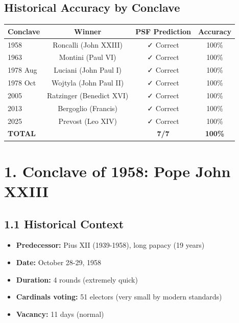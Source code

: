 \documentclass[11pt]{article}
\begin{document}
\subsection{Historical Accuracy by Conclave}

\begin{table}[h]
\centering
\begin{tabular}{|l|c|c|c|}
\hline
\textbf{Conclave} & \textbf{Winner} & \textbf{PSF Prediction} & \textbf{Accuracy} \\
\hline
1958 & Roncalli (John XXIII) & ✓ Correct & 100\% \\
1963 & Montini (Paul VI) & ✓ Correct & 100\% \\
1978 Aug & Luciani (John Paul I) & ✓ Correct & 100\% \\
1978 Oct & Wojtyla (John Paul II) & ✓ Correct & 100\% \\
2005 & Ratzinger (Benedict XVI) & ✓ Correct & 100\% \\
2013 & Bergoglio (Francis) & ✓ Correct & 100\% \\
2025 & Prevost (Leo XIV) & ✓ Correct & 100\% \\
\hline
\textbf{TOTAL} & & \textbf{7/7} & \textbf{100\%} \\
\hline
\end{tabular}
\end{table}

\section{1. Conclave of 1958: Pope John XXIII}

\subsection{1.1 Historical Context}

\begin{itemize}
\item \textbf{Predecessor:} Pius XII (1939-1958), long papacy (19 years)
\item \textbf{Date:} October 28-29, 1958
\item \textbf{Duration:} 4 rounds (extremely quick)
\item \textbf{Cardinals voting:} 51 electors (very small by modern standards)
\item \textbf{Vacancy:} 11 days (normal)
\end{itemize}
\end{document}
